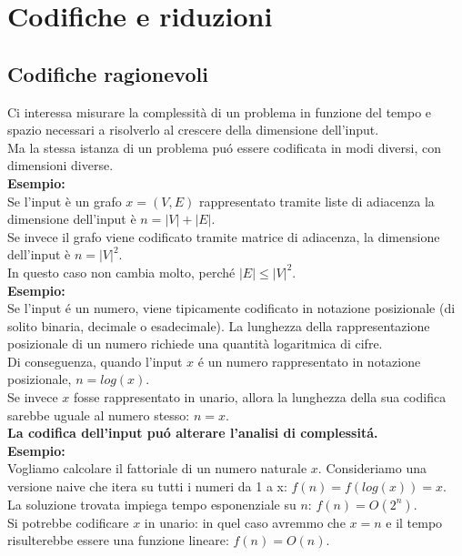 \section{Codifiche e riduzioni}

\subsection{Codifiche ragionevoli}

Ci interessa misurare la complessità di un problema in funzione del tempo e spazio necessari a risolverlo al crescere della dimensione dell'input. \\
Ma la stessa istanza di un problema puó essere codificata in modi diversi, con dimensioni diverse. \\

\textbf{Esempio:} \\
Se l'input è un grafo $x = (V, E)$ rappresentato tramite liste di adiacenza la dimensione dell'input è $n = |V| + |E|$. \\
Se invece il grafo viene codificato tramite matrice di adiacenza, la dimensione dell'input è $n = |V|^2$. \\
In questo caso non cambia molto, perché $|E| \leq |V|^2$. \\

\textbf{Esempio:} \\
Se l'input é un numero, viene tipicamente codificato in notazione posizionale (di solito binaria, decimale o esadecimale).
La lunghezza della rappresentazione posizionale di un numero richiede una quantità logaritmica di cifre. \\
Di conseguenza, quando l'input $x$ é un numero rappresentato in notazione posizionale, $n = log(x)$. \\
Se invece $x$ fosse rappresentato in unario, allora la lunghezza della sua codifica sarebbe uguale al numero stesso: $n = x$. \\

\textbf{La codifica dell'input puó alterare l'analisi di complessitá.} \\

\textbf{Esempio:} \\
Vogliamo calcolare il fattoriale di un numero naturale $x$. Consideriamo una versione naive che itera su tutti i numeri da 1 a x: $f(n) = f(log(x)) = x$. \\
La soluzione trovata impiega tempo esponenziale su $n$: $f(n) = O(2^n)$. \\
Si potrebbe codificare $x$ in unario: in quel caso avremmo che $x = n$ e il tempo risulterebbe essere una funzione lineare: $f(n) = O(n)$. \\

